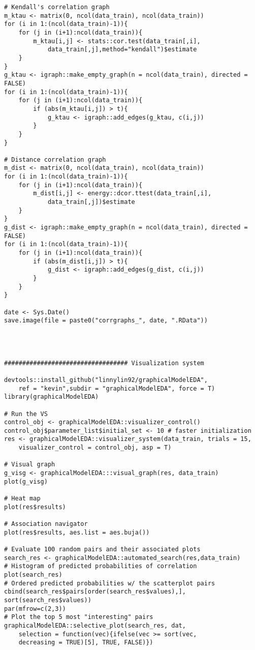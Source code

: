 {\begin{lstlisting}
# Kendall's correlation graph
m_ktau <- matrix(0, ncol(data_train), ncol(data_train))
for (i in 1:(ncol(data_train)-1)){
	for (j in (i+1):ncol(data_train)){
		m_ktau[i,j] <- stats::cor.test(data_train[,i],
			data_train[,j],method="kendall")$estimate
	}
}
g_ktau <- igraph::make_empty_graph(n = ncol(data_train), directed = FALSE)
for (i in 1:(ncol(data_train)-1)){
	for (j in (i+1):ncol(data_train)){
		if (abs(m_ktau[i,j]) > t){
			g_ktau <- igraph::add_edges(g_ktau, c(i,j))
		}
	}
}

# Distance correlation graph
m_dist <- matrix(0, ncol(data_train), ncol(data_train))
for (i in 1:(ncol(data_train)-1)){
	for (j in (i+1):ncol(data_train)){
		m_dist[i,j] <- energy::dcor.ttest(data_train[,i],
			data_train[,j])$estimate
	}
}
g_dist <- igraph::make_empty_graph(n = ncol(data_train), directed = FALSE)
for (i in 1:(ncol(data_train)-1)){
	for (j in (i+1):ncol(data_train)){
		if (abs(m_dist[i,j]) > t){
			g_dist <- igraph::add_edges(g_dist, c(i,j))
		}
	}
}

date <- Sys.Date()
save.image(file = paste0("corrgraphs_", date, ".RData"))




################################## Visualization system

devtools::install_github("linnylin92/graphicalModelEDA", 
	ref = "kevin",subdir = "graphicalModelEDA", force = T)
library(graphicalModelEDA)

# Run the VS
control_obj <- graphicalModelEDA::visualizer_control()
control_obj$parameter_list$initial_set <- 10 # faster initialization
res <- graphicalModelEDA::visualizer_system(data_train, trials = 15, 
	visualizer_control = control_obj, asp = T)

# Visual graph
g_visg <- graphicalModelEDA:::visual_graph(res, data_train)
plot(g_visg)

# Heat map
plot(res$results)

# Association navigator
plot(res$results, aes.list = aes.buja())

# Evaluate 100 random pairs and their associated plots
search_res <- graphicalModelEDA::automated_search(res,data_train)
# Histogram of predicted probabilities of correlation
plot(search_res) 
# Ordered predicted probabilities w/ the scatterplot pairs
cbind(search_res$pairs[order(search_res$values),], sort(search_res$values)) 
par(mfrow=c(2,3))
# Plot the top 5 most "interesting" pairs
graphicalModelEDA::selective_plot(search_res, dat, 
	selection = function(vec){ifelse(vec >= sort(vec, 
	decreasing = TRUE)[5], TRUE, FALSE)})


\end{lstlisting}}
